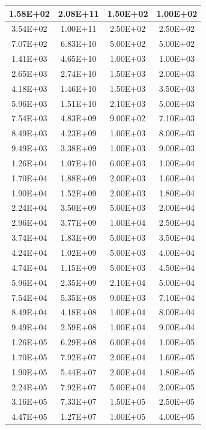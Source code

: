 \documentclass{hitec}
\begin{document}
\begin{table}[!h]
\begin{tabular}{|c | c | c | c |}
1.58E+02&2.08E+11&1.50E+02&1.00E+02\\\hline
3.54E+02&1.00E+11&2.50E+02&2.50E+02\\\hline
7.07E+02&6.83E+10&5.00E+02&5.00E+02\\\hline
1.41E+03&4.65E+10&1.00E+03&1.00E+03\\\hline
2.65E+03&2.74E+10&1.50E+03&2.00E+03\\\hline
4.18E+03&1.46E+10&1.50E+03&3.50E+03\\\hline
5.96E+03&1.51E+10&2.10E+03&5.00E+03\\\hline
7.54E+03&4.83E+09&9.00E+02&7.10E+03\\\hline
8.49E+03&4.23E+09&1.00E+03&8.00E+03\\\hline
9.49E+03&3.38E+09&1.00E+03&9.00E+03\\\hline
1.26E+04&1.07E+10&6.00E+03&1.00E+04\\\hline
1.70E+04&1.88E+09&2.00E+03&1.60E+04\\\hline
1.90E+04&1.52E+09&2.00E+03&1.80E+04\\\hline
2.24E+04&3.50E+09&5.00E+03&2.00E+04\\\hline
2.96E+04&3.77E+09&1.00E+04&2.50E+04\\\hline
3.74E+04&1.83E+09&5.00E+03&3.50E+04\\\hline
4.24E+04&1.02E+09&5.00E+03&4.00E+04\\\hline
4.74E+04&1.15E+09&5.00E+03&4.50E+04\\\hline
5.96E+04&2.35E+09&2.10E+04&5.00E+04\\\hline
7.54E+04&5.35E+08&9.00E+03&7.10E+04\\\hline
8.49E+04&4.18E+08&1.00E+04&8.00E+04\\\hline
9.49E+04&2.59E+08&1.00E+04&9.00E+04\\\hline
1.26E+05&6.29E+08&6.00E+04&1.00E+05\\\hline
1.70E+05&7.92E+07&2.00E+04&1.60E+05\\\hline
1.90E+05&5.44E+07&2.00E+04&1.80E+05\\\hline
2.24E+05&7.92E+07&5.00E+04&2.00E+05\\\hline
3.16E+05&7.33E+07&1.50E+05&2.50E+05\\\hline
4.47E+05&1.27E+07&1.00E+05&4.00E+05\\\hline
	\end{tabular}
\end{table}
\clearpage %

\end{document}
